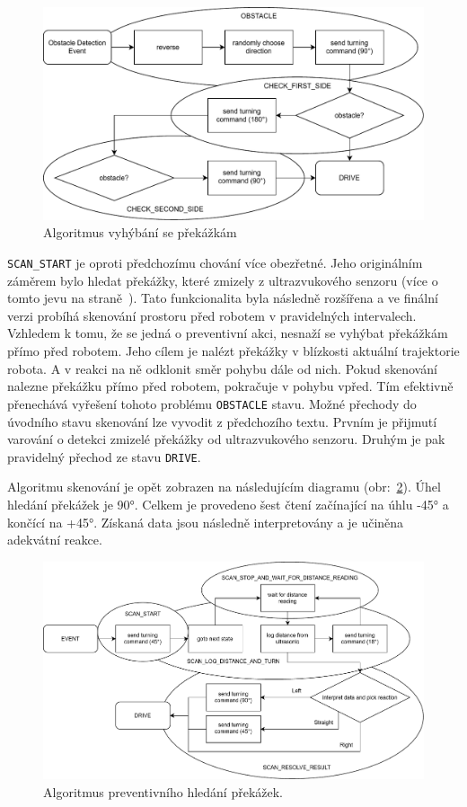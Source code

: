 \begin{figure}[h!]
	\centering
	\includegraphics[scale=0.75]{obrazky-figures/wandering_obstacle_diagram.pdf}
	\caption{Algoritmus vyhýbání se překážkám}
	\label{fig:alg_obstacle}
\end{figure}

\verb|SCAN_START| je oproti předchozímu chování více obezřetné. Jeho originálním záměrem bylo hledat překážky, které zmizely z ultrazvukového senzoru (více o tomto jevu na straně~\pageref{implementation:ultrasonic}). Tato funkcionalita byla následně rozšířena a ve finální verzi probíhá skenování prostoru před robotem v pravidelných intervalech. Vzhledem k tomu, že se jedná o preventivní akci, nesnaží se vyhýbat překážkám přímo před robotem. Jeho cílem je nalézt překážky v blízkosti aktuální trajektorie robota. A v reakci na ně odklonit směr pohybu dále od nich. Pokud skenování nalezne překážku přímo před robotem, pokračuje v pohybu vpřed. Tím efektivně přenechává vyřešení tohoto problému \verb|OBSTACLE| stavu. Možné přechody do úvodního stavu skenování lze vyvodit z předchozího textu. Prvním je přijmutí varování o detekci zmizelé překážky od ultrazvukového senzoru. Druhým je pak pravidelný přechod ze stavu \verb|DRIVE|.

Algoritmu skenování je opět zobrazen na následujícím diagramu (obr:~\ref{fig:alg_scan}). Úhel hledání překážek je 90°. Celkem je provedeno šest čtení začínající na úhlu -45° a končící na +45°. Získaná data jsou následně interpretovány a je učiněna adekvátní reakce.

\begin{figure}[h!]
	\centering
	\includegraphics[scale=0.65]{obrazky-figures/wandering_scan_diagram.pdf}
	\caption{Algoritmus preventivního hledání překážek.}
	\label{fig:alg_scan}
\end{figure}


